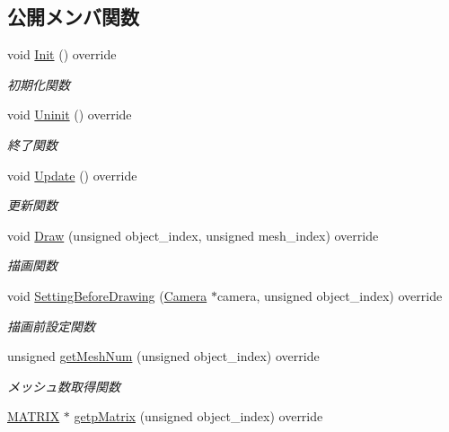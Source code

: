 \subsection*{公開メンバ関数}
\begin{DoxyCompactItemize}
\item 
void \mbox{\hyperlink{class_coin_draw_ad0f5da5cfb896541fd59b1ab4a8593d1}{Init}} () override
\begin{DoxyCompactList}\small\item\em 初期化関数 \end{DoxyCompactList}\item 
void \mbox{\hyperlink{class_coin_draw_a6484c22a5598e298f18e7cd6083cd551}{Uninit}} () override
\begin{DoxyCompactList}\small\item\em 終了関数 \end{DoxyCompactList}\item 
void \mbox{\hyperlink{class_coin_draw_a6157b17bf1706b85156aad0d88acfd7e}{Update}} () override
\begin{DoxyCompactList}\small\item\em 更新関数 \end{DoxyCompactList}\item 
void \mbox{\hyperlink{class_coin_draw_ac7d91fecb6845cebe276eb81a4953563}{Draw}} (unsigned object\+\_\+index, unsigned mesh\+\_\+index) override
\begin{DoxyCompactList}\small\item\em 描画関数 \end{DoxyCompactList}\item 
void \mbox{\hyperlink{class_coin_draw_a66c03acd675ac1820977cb21015abfdb}{Setting\+Before\+Drawing}} (\mbox{\hyperlink{class_camera}{Camera}} $\ast$camera, unsigned object\+\_\+index) override
\begin{DoxyCompactList}\small\item\em 描画前設定関数 \end{DoxyCompactList}\item 
unsigned \mbox{\hyperlink{class_coin_draw_a8ebedf2582d53b40016ebd3f0e82c38e}{get\+Mesh\+Num}} (unsigned object\+\_\+index) override
\begin{DoxyCompactList}\small\item\em メッシュ数取得関数 \end{DoxyCompactList}\item 
\mbox{\hyperlink{_vector3_d_8h_a032295cd9fb1b711757c90667278e744}{M\+A\+T\+R\+IX}} $\ast$ \mbox{\hyperlink{class_coin_draw_ad8cbbe87f4cf4428214f50492c731f5f}{getp\+Matrix}} (unsigned object\+\_\+index) override

\end{DoxyCompactItemize}
